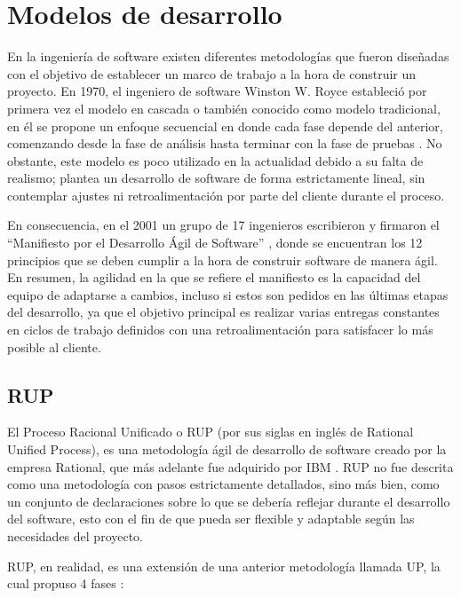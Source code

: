 \section{Modelos de desarrollo}

En la ingeniería de software existen diferentes metodologías que fueron diseñadas con el objetivo de establecer un marco de trabajo a la hora de construir un proyecto. En 1970, el ingeniero de software Winston W. Royce estableció por primera vez el modelo en cascada \autocite{cataldi1999} o también conocido como modelo tradicional, en él se propone un enfoque secuencial en donde cada fase depende del anterior, comenzando desde la fase de análisis hasta terminar con la fase de pruebas \autocite{pressman2001}. No obstante, este modelo es poco utilizado en la actualidad debido a su falta de realismo; plantea un desarrollo de software de forma estrictamente lineal, sin contemplar ajustes ni retroalimentación por parte del cliente durante el proceso.

En consecuencia, en el 2001 un grupo de 17 ingenieros escribieron y firmaron el “Manifiesto por el Desarrollo Ágil de Software” \autocite{agileManifesto2001}, donde se encuentran los 12 principios que se deben cumplir a la hora de construir software de manera ágil. En resumen, la agilidad en la que se refiere el manifiesto es la capacidad del equipo de adaptarse a cambios, incluso si estos son pedidos en las últimas etapas del desarrollo, ya que el objetivo principal es realizar varias entregas constantes en ciclos de trabajo definidos con una retroalimentación para satisfacer lo más posible al cliente.

\subsection{RUP}

El Proceso Racional Unificado o RUP (por sus siglas en inglés de Rational Unified Process), es una metodología ágil de desarrollo de software creado por la empresa Rational, que más adelante fue adquirido por IBM \autocite{ibmAcquiresRational2002}. RUP no fue descrita como una metodología con pasos estrictamente detallados, sino más bien, como un conjunto de declaraciones sobre lo que se debería reflejar durante el desarrollo del software, esto con el fin de que pueda ser flexible y adaptable según las necesidades del proyecto.

RUP, en realidad, es una extensión de una anterior metodología llamada UP, la cual propuso 4 fases \autocite{anderson2003}:

